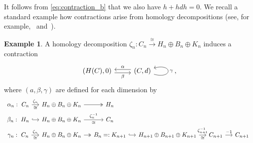 \documentclass[11pt, table, nothms]{amsart}
\theoremstyle{definition}
\newtheorem{example}[theorem]{Example}
\begin{document}
{It follows from \cref{eq:contraction_b} that we also have $h + hdh=0$.
We recall a standard example how contractions arise from homology decompositions (see, for example,~\cite[Prop.~3.4.5.]{Mrozek2025ConnectionDynamics} and~\cite[\S 1.4]{Weibel1994AnAlgebra}).
\begin{example} \label{ex:basic_contraction}
A homology decomposition $\zeta_n: C_n \xrightarrow{\cong} H_n \oplus B_n \oplus K_{n}$ induces a contraction 
    \[
    \begin{tikzcd}[ampersand replacement = \&]
	(H(C), 0) \& (C,d)
	\arrow["\beta"', shift right, from=1-1, to=1-2]
	\arrow["\alpha"', shift right, from=1-2, to=1-1]
	\arrow["\gamma"', from=1-2, to=1-2, loop, in=15, out=345, distance=10mm]
\end{tikzcd},
    \]
    where $(a, \beta, \gamma)$ are defined for each dimension by
\[\begin{tikzcd}[ampersand replacement  = \&, column sep=small, row sep = small]
{\alpha_n:\ C_n} \& {H_n \oplus B_n \oplus K_n} \& {H_n} \\
	{\beta_n:\ H_n} \& {H_n \oplus B_n \oplus K_{n}} \& {C_n} \\
	{\gamma_n:\ C_n} \& {H_n \oplus B_n \oplus K_{n}} \& {B_n=:K_{n+1}} \& {H_{n+1} \oplus B_{n+1} \oplus K_{n+1}} \& {C_{n+1}} \& {C_{n+1}}
	\arrow["{\zeta_n}", "\cong"', from=1-1, to=1-2]
	\arrow[two heads, from=1-2, to=1-3]
	\arrow[hook, from=2-1, to=2-2]
	\arrow["{\zeta_n^{-1}}", "\cong"', from=2-2, to=2-3]
	\arrow["{\zeta_n}", "\cong"', from=3-1, to=3-2]
	\arrow[two heads, from=3-2, to=3-3]
	\arrow[hook, from=3-3, to=3-4]
	\arrow["{\zeta_{n+1}^{-1}}", "\cong"',  from=3-4, to=3-5]
    \arrow["-1",  from=3-5, to=3-6]
\end{tikzcd}\]

\end{example}
\iffalse

}
\end{document}
